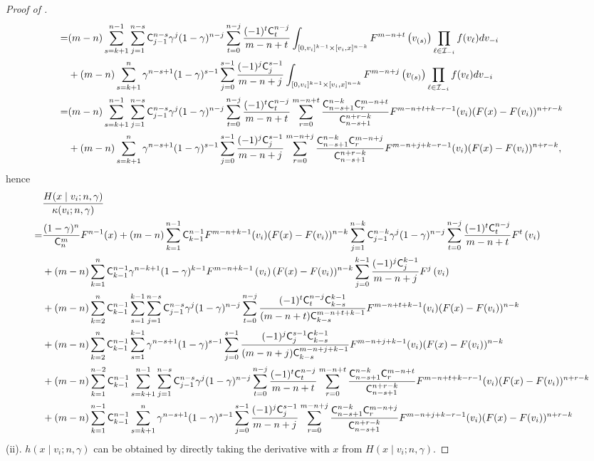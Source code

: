 \begin{proof}[Proof of ]
{\begin{align*}
=&(m-n) \sum_{s=k+1}^{n-1}\sum_{j=1}^{n-s} \mathsf{C}^{n-s}_{j-1}\gamma^j
 (1-\gamma)^{n-j}\sum_{t=0}^{n-j}\frac{(-1)^{t}\mathsf{C}^{n-j}_t}{m-n+t} \int_{[0,v_i]^{k-1}\times [v_i,x]^{n-k}} F^{m-n+t}\left(v_{(s)}\right)\prod_{\ell\in \mathcal{I}_{-i}} f(v_{\ell})dv_{-i} \\
 &+ (m-n) \sum_{s=k+1}^{n}\gamma^{n-s+1}
 (1-\gamma)^{s-1}\sum_{j=0}^{s-1}\frac{(-1)^{j}\mathsf{C}^{s-1}_j}{m-n+j}\int_{[0,v_i]^{k-1}\times [v_i,x]^{n-k}} F^{m-n+j}\left(v_{(s)}\right)\prod_{\ell\in \mathcal{I}_{-i}} f(v_{\ell})dv_{-i}\\
 =& (m-n) \sum_{s=k+1}^{n-1}\sum_{j=1}^{n-s} \mathsf{C}^{n-s}_{j-1}\gamma^j
 (1-\gamma)^{n-j}\sum_{t=0}^{n-j}\frac{(-1)^{t}\mathsf{C}^{n-j}_t}{m-n+t}\sum_{r=0}^{m-n+t}\frac{\mathsf{C}^{n-k}_{n-s+1}\mathsf{C}^{m-n+t}_r}{\mathsf{C}^{n+r-k}_{n-s+1}}F^{m-n+t+k-r-1}(v_i)(F(x) - F(v_i))^{n+r-k}\\
 & + (m-n) \sum_{s=k+1}^{n}\gamma^{n-s+1}
 (1-\gamma)^{s-1}\sum_{j=0}^{s-1}\frac{(-1)^{j}\mathsf{C}^{s-1}_j}{m-n+j}\sum_{r=0}^{m-n+j}\frac{\mathsf{C}^{n-k}_{n-s+1}\mathsf{C}^{m-n+j}_r}{\mathsf{C}^{n+r-k}_{n-s+1}}F^{m-n+j+k-r-1}(v_i)(F(x) - F(v_i))^{n+r-k},
\end{align*}}
hence 
{\footnotesize
\begin{align*}
&\frac{H(x\mid v_i;n,\gamma)}{\kappa(v_i;n,\gamma)}\\
=& \frac{(1-\gamma)^n}{\mathsf{C}^m_n}F^{n-1}(x) + (m-n)\sum_{k=1}^{n-1}\mathsf{C}^{n-1}_{k-1} F^{m-n+k-1}(v_i)(F(x) - F(v_i))^{n-k} \sum_{j=1}^{n-k} \mathsf{C}^{n-k}_{j-1}\gamma^j
 (1-\gamma)^{n-j}\sum_{t=0}^{n-j}\frac{(-1)^{t}\mathsf{C}^{n-j}_t}{m-n+t}F^{t}\left(v_{i}\right)\\
 & + (m-n)\sum_{k=1}^{n}\mathsf{C}^{n-1}_{k-1} \gamma^{n-k+1}
 (1-\gamma)^{k-1}F^{m-n+k-1}\left(v_{i}\right)(F(x) - F(v_i))^{n-k}\sum_{j=0}^{k-1}\frac{(-1)^{j}\mathsf{C}^{k-1}_j}{m-n+j}F^{j}\left(v_{i}\right)\\
 & + (m-n) \sum_{k=2}^{n}\mathsf{C}^{n-1}_{k-1}\sum_{s=1}^{k-1}\sum_{j=1}^{n-s} \mathsf{C}^{n-s}_{j-1}\gamma^j
 (1-\gamma)^{n-j}\sum_{t=0}^{n-j}\frac{(-1)^{t}\mathsf{C}^{n-j}_t\mathsf{C}^{k-1}_{k-s}}{(m-n+t)\mathsf{C}^{m-n+t+k-1}_{k-s}}F^{m-n+t+k-1}(v_i)(F(x) - F(v_i))^{n-k}\\
 & + (m-n)\sum_{k=2}^{n} \mathsf{C}^{n-1}_{k-1}\sum_{s=1}^{k-1}\gamma^{n-s+1}
 (1-\gamma)^{s-1}\sum_{j=0}^{s-1}\frac{(-1)^{j}\mathsf{C}^{s-1}_j\mathsf{C}^{k-1}_{k-s}}{(m-n+j)\mathsf{C}^{m-n+j+k-1}_{k-s}}F^{m-n+j+k-1}(v_i)(F(x) - F(v_i))^{n-k}\\
 & + (m-n)\sum_{k=1}^{n-2}\mathsf{C}^{n-1}_{k-1} \sum_{s=k+1}^{n-1}\sum_{j=1}^{n-s} \mathsf{C}^{n-s}_{j-1}\gamma^j
 (1-\gamma)^{n-j}\sum_{t=0}^{n-j}\frac{(-1)^{t}\mathsf{C}^{n-j}_t}{m-n+t}\sum_{r=0}^{m-n+t}\frac{\mathsf{C}^{n-k}_{n-s+1}\mathsf{C}^{m-n+t}_r}{\mathsf{C}^{n+r-k}_{n-s+1}}F^{m-n+t+k-r-1}(v_i)(F(x) - F(v_i))^{n+r-k}\\
 & + (m-n)\sum_{k=1}^{n-1} \mathsf{C}^{n-1}_{k-1}\sum_{s=k+1}^{n}\gamma^{n-s+1}
 (1-\gamma)^{s-1}\sum_{j=0}^{s-1}\frac{(-1)^{j}\mathsf{C}^{s-1}_j}{m-n+j}\sum_{r=0}^{m-n+j}\frac{\mathsf{C}^{n-k}_{n-s+1}\mathsf{C}^{m-n+j}_r}{\mathsf{C}^{n+r-k}_{n-s+1}}F^{m-n+j+k-r-1}(v_i)(F(x) - F(v_i))^{n+r-k}
\end{align*}
}
(ii). $h(x\mid v_i;n,\gamma)$ can be obtained by directly taking the derivative with $x$ from $H(x\mid v_i;n,\gamma)$.
\end{proof}


